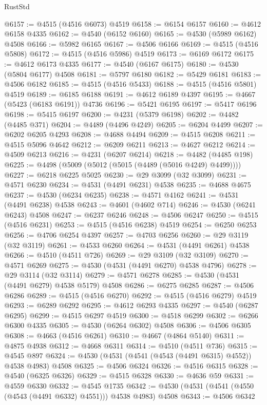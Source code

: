 \begin{lexlean}{RustStd}
\begin{coremodule}
@6157 := @4515 (@4516 @6073) @4519
@6158 := @6154 @6157
@6160 := @4612 @6158 @4335
@6162 := @4540 (@6152 @6160)
@6165 := @4530 (@5989 @6162) @4508
@6166 := @5982 @6165
@6167 := @4506 @6166
@6169 := @4515 (@4516 @5808)
@6172 := @4515 (@4516 @5986) @4519
@6173 := @6169 @6172
@6175 := @4612 @6173 @4335
@6177 := @4540 (@6167 @6175)
@6180 := @4530 (@5804 @6177) @4508
@6181 := @5797 @6180
@6182 := @5429 @6181
@6183 := @4506 @6182
@6185 := @4515 (@4516 @5433)
@6188 := @4515 (@4516 @5801) @4519
@6189 := @6185 @6188
@6191 := @4612 @6189 @4397
@6195 := @4667 (@5423 (@6183 @6191)) @4736
@6196 := @5421 @6195
@6197 := @5417 @6196
@6198 := @5415 @6197
@6200 := @4231 (@5379 @6198)
@6202 := @4482 (@4485 @371)
@6204 := @4489 (@4496 @4249)
@6205 := @6204 @4499
@6207 := @6202 @6205 @4293
@6208 := @4688 @4494
@6209 := @4515 @6208
@6211 := @4515 @5096 @4642
@6212 := @6209 @6211
@6213 := @4627 @6212
@6214 := @4509 @6213
@6216 := @4231 (@6207 @6214)
@6218 := @4482 (@4485 @198)
@6225 := @4498 (@5009 (@5012 (@5015 (@4489 (@5016 @4249) @4499))))
@6227 := @6218 @6225 @5025
@6230 := @29 @3099 (@32 @3099)
@6231 := @4571 @6230
@6234 := @4531 (@4491 @6231) @4538
@6235 := @4688 @4675
@6237 := @4530 (@6234 @6235)
@6238 := @4571 @4162
@6241 := @4531 (@4491 @6238) @4538
@6243 := @4601 (@4602 @714)
@6246 := @4530 (@6241 @6243) @4508
@6247 := @6237 @6246
@6248 := @4506 @6247
@6250 := @4515 (@4516 @6231)
@6253 := @4515 (@4516 @6238) @4519
@6254 := @6250 @6253
@6256 := @4706 @6254 @4397
@6257 := @4703 @6256
@6260 := @29 @3119 (@32 @3119)
@6261 := @4533 @6260
@6264 := @4531 (@4491 @6261) @4538
@6266 := @4510 (@4511 @726)
@6269 := @29 @3109 (@32 @3109)
@6270 := @4571 @6269
@6275 := @4530 (@4531 (@4491 @6270) @4538 @4796)
@6278 := @29 @3114 (@32 @3114)
@6279 := @4571 @6278
@6285 := @4530 (@4531 (@4491 @6279) @4538 @5179) @4508
@6286 := @6275 @6285
@6287 := @4506 @6286
@6289 := @4515 (@4516 @6270)
@6292 := @4515 (@4516 @6279) @4519
@6293 := @6289 @6292
@6295 := @4612 @6293 @4335
@6297 := @4540 (@6287 @6295)
@6299 := @4515 @6297 @4519
@6300 := @4518 @6299
@6302 := @6266 @6300 @4335
@6305 := @4530 (@6264 @6302) @4508
@6306 := @4506 @6305
@6308 := @4663 (@4516 @6261)
@6310 := @4667 (@4864 @5140)
@6311 := @4875 @4938
@6312 := @4668 @6311
@6314 := @4510 (@4511 @736)
@6315 := @4545 @897
@6324 := @4530 (@4531 (@4541 (@4543 (@4491 @6315) @4552)) @4538 @4983) @4508
@6325 := @4506 @6324
@6326 := @4516 @6315
@6328 := @4540 (@6325 @6326)
@6329 := @4515 @6328
@6330 := @4636 @59
@6331 := @4559 @6330
@6332 := @4545 @1735
@6342 := @4530 (@4531 (@4541 (@4550 (@4543 (@4491 @6332) @4551))) @4538 @4983) @4508
@6343 := @4506 @6342

\end{coremodule}
\end{lexlean}
